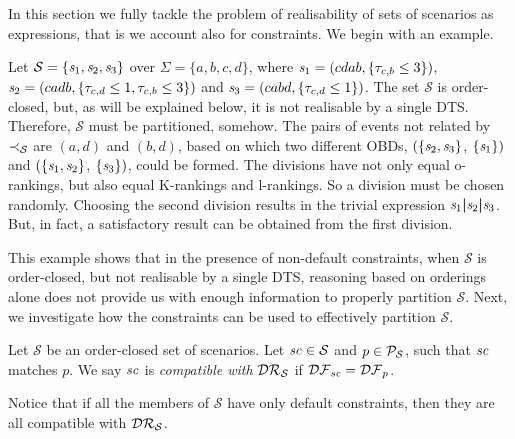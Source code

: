 In this section we fully tackle the problem of realisability of sets
of scenarios as expressions, that is we account also for
constraints. We begin with an example.
\begin{example}
\label{ex-with-time-1}
Let $\mathcal{S}=\{\mathit{s}_1,\mathit{s}_2,\mathit{s}_3\}$ over $\Sigma=\{a,b,c,d\}$, where
$\mathit{s}_1=(cdab,\{\tau_{c,b} \leq 3\})$,
$\mathit{s}_2=(cadb,\{\tau_{c,d} \leq 1,\tau_{c,b} \leq 3\})$ and
$\mathit{s}_3=(cabd,\{\tau_{c,d} \leq 1\})$.
The set $\mathcal{S}$ is order-closed,
but, as will be explained below, it is not realisable by a single
DTS. Therefore, $\mathcal{S}$ must be partitioned, somehow.
The pairs of events not related by $\prec_{\mathcal{S}}$ are $(a,d)$ and
$(b,d)$, based on which two different OBDs,
 $(\{\mathit{s}_2,\mathit{s}_3\}$, $\{\mathit{s}_1\})$ and $(\{\mathit{s}_1,\mathit{s}_2\}$,
$\{\mathit{s}_3\})$, could be formed.
The divisions have not only equal o-rankings, but also equal
K-rankings and l-rankings.
So a division must be chosen randomly. Choosing the second division
results in the trivial expression
$\mathit{s}_1\boldsymbol{|}\mathit{s}_2\boldsymbol{|}\mathit{s}_3$. But, in
fact, a satisfactory result can be obtained from the first division.
\end{example}
\noindent
This example shows that in the presence of non-default constraints, when
${\mathcal{S}}$ is order-closed, but not realisable by a single DTS,
reasoning based on orderings alone
does not provide us with enough information to properly partition
${\mathcal{S}}$.
Next, we investigate how the constraints can be used to effectively
partition $\mathcal{S}$.
\begin{definition}
\label{def-locally-stable}
Let $\mathcal{S}$ be an order-closed set of scenarios.
Let $\mathit{sc}\in\mathcal{S}$ and
$p\in\mathcal{P}_{\mathcal{S}}$, such that $\mathit{sc}$ matches $p$.
We say $\mathit{sc}$ is \emph{compatible with} $\mathcal{DR}_{\mathcal{S}}$
if $\mathcal{DF}_{\mathit{sc}}=\mathcal{DF}_{p}$.
\end{definition}
\noindent
Notice that if all the members of $\mathcal{S}$ have
only default constraints, then they are all compatible with
$\mathcal{DR}_{\mathcal{S}}$.

